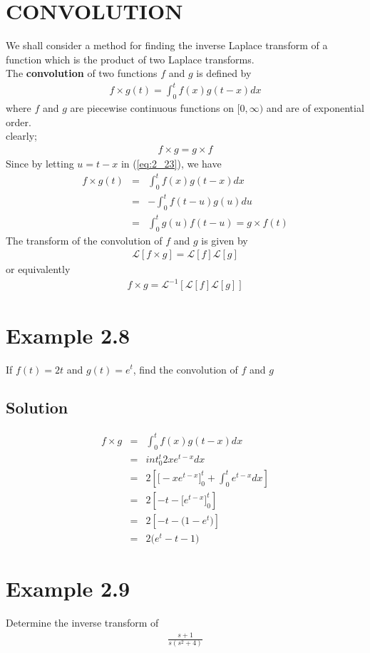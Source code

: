 \documentclass[11pt]{report}
\newcommand{\Laplace}{\mathcal{L}}
\newcommand{\ft}{f(t)}
\newcommand{\sbracket}[1]{\left[#1\right]}
\newcommand{\LFn}[1]{\Laplace \sbracket{#1}}
\newcommand{\InverseL}[1]{\Laplace^{-1}\left[#1\right]}
\newcommand{\sps}{\\[0.2cm]}
\newcommand{\refn}[1]{(\ref{#1})}
\newcommand{\refx}[1]{\refn{eq:#1}}
\newcommand{\bt}[1]{\textbf{#1}}
\begin{document}
	\section{CONVOLUTION}
	We shall consider a method for finding the inverse Laplace transform of a function which is the product of two Laplace transforms.\sps
	The \bt{convolution} of two functions $f$ and $g$ is defined by 
	\begin{eqnarray}
		f\times g(t) = \int_0^tf(x)g(t-x)dx\label{eq:2_23}
	\end{eqnarray}
	where $f$ and $g$ are piecewise continuous functions on $[0,\infty)$ and are of exponential order.\sps
	clearly;
	\begin{eqnarray*}
		f\times g = g\times f
	\end{eqnarray*}
	Since by letting $u=t-x$ in \refx{2_23}, we have
	\begin{eqnarray*}
		f\times g(t) &=&\int_0^tf(x)g(t-x)dx\sps
		&=&-\int_0^t f(t-u)g(u)du\sps
		&=&\int_0^t g(u)f(t-u) = g\times f(t)
	\end{eqnarray*}
	The transform of the convolution of $f$ and $g$ is given by
	\begin{eqnarray}
		\LFn{f\times g} = \LFn{f}\LFn{g}\label{eq:2_24}
	\end{eqnarray}
	or equivalently
	\begin{eqnarray}
		f\times g = \InverseL{\LFn{f}\LFn{g}}\label{eq:2_25}
	\end{eqnarray}

	\section*{Example 2.8}
	If $\ft=2t$ and $g(t)=e^t$, find the convolution of $f$ and $g$\sps
	\subsection*{Solution}
	\begin{eqnarray*}
		f\times g &=&\int_0^t f(x)g(t-x)dx\sps
		&=&int_0^t 2xe^{t-x}dx\sps
		&=& 2\left[\Big[-xe^{t-x}\Big]_0^t + \int_0^te^{t-x}dx\right]\sps
		&=&2\left[-t - \Big[e^{t-x}\Big]_0^t\right]\sps
		&=&2\left[-t - \Big(1-e^t\Big)\right]\sps
		&=&2\Big(e^t-t-1\Big)
	\end{eqnarray*}

	\section*{Example 2.9}
	Determine the inverse transform of
	\begin{eqnarray*}
		\frac{s+1}{s(s^2+4)}
	\end{eqnarray*}
\end{document}
